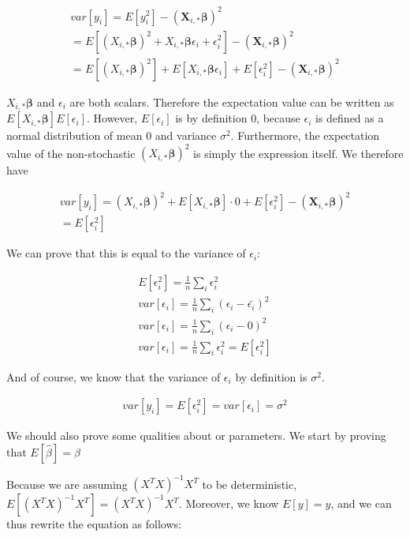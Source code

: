 \documentclass[twocolumn,10pt,cleanfoot]{asme2ej}
\begin{document}
\begin{gather}
var[y_i] = E[y_i^2] - (\bm{X}_{i,*}\bm{\beta})^2  \\
= E\left[(X_{i,*}\bm{\beta})^2 + X_{i,*}\bm{\beta}\epsilon_i + \epsilon_i^2\right] - (\bm{X}_{i,*}\bm{\beta})^2  \\
= E\left[(X_{i,*}\bm{\beta})^2\right] + E[X_{i,*}\bm{\beta}\epsilon_i] + E[\epsilon_i^2] - (\bm{X}_{i,*}\bm{\beta})^2
\end{gather}

$X_{i,*}\bm{\beta}$ and $\epsilon_i$ are both scalars. Therefore the expectation value can be written as $E[X_{i,*}\bm{\beta}]E[\epsilon_i]$. However, $E[\epsilon_i]$ is by definition $0$, because $\epsilon_i$ is defined as a normal distribution of mean $0$ and variance $\sigma^2$. Furthermore, the expectation value of the non-stochastic $(X_{i,*}\bm{\beta})^2$ is simply the expression itself. We therefore have

\begin{gather}
var[y_i] = (X_{i,*}\bm{\beta})^2 + E[X_{i,*}\bm{\beta}]\cdot 0 + E[\epsilon_i^2] - (\bm{X}_{i,*}\bm{\beta})^2  \\
= E[\epsilon_i^2]
\end{gather}

We can prove that this is equal to the variance of $\epsilon_i$:

\begin{gather}
E[\epsilon_i^2] = \frac{1}{n} \sum_i \epsilon_i^2 \\
var[\epsilon_i] = \frac{1}{n} \sum_i (\epsilon_i - \bar{\epsilon_i})^2 \\
var[\epsilon_i] = \frac{1}{n} \sum_i (\epsilon_i - 0)^2 \\
var[\epsilon_i] = \frac{1}{n} \sum_i \epsilon_i^2 = E[\epsilon_i^2]
\end{gather}

And of course, we know that the variance of $\epsilon_i$ by definition is $\sigma^2$.

\begin{gather}
var[y_i] = E[\epsilon_i^2] = var[\epsilon_i] = \sigma^2 
\end{gather}

We should also prove some qualities about or parameters. We start by proving that $E[\hat{\beta}] = \beta$

Because we are assuming $(X^{T}X)^{-1}X^{T}$ to be deterministic, $E[(X^{T}X)^{-1}X^{T}] = (X^{T}X)^{-1}X^{T}$. Moreover, we know $E[y] = y$, and we can thus rewrite the equation as follows:
\end{document}
